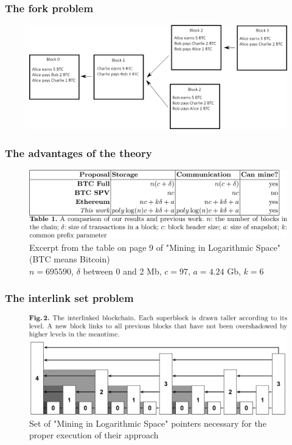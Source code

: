 \documentclass{beamer}
\begin{document}
\begin{frame}

\frametitle{The fork problem}

\begin{figure}[H]
		\includegraphics[width=\linewidth]{illustrationsSoutenance/forkContinueEN.png}
	\end{figure}

\end{frame}


\begin{frame}

\frametitle{The advantages of the theory}

\begin{figure}[H]
		\includegraphics[width=\linewidth]{illustrations/tableauPage9.png}
		\caption{Excerpt from the table on page 9 of "Mining in Logarithmic Space" (BTC means Bitcoin)\\$n = 695 590$, $\delta$ between 0 and 2 Mb, $c = 97$, $a = 4.24$ Gb, $k = 6$}
	\end{figure}

\end{frame}

\begin{frame}

\frametitle{The interlink set problem}

\begin{figure}[H]
		\includegraphics[width=\linewidth]{illustrations/interlinkSet.png}
		\caption{Set of "Mining in Logarithmic Space" pointers necessary for the proper execution of their approach}
	\end{figure}

\end{frame}
\end{document}
